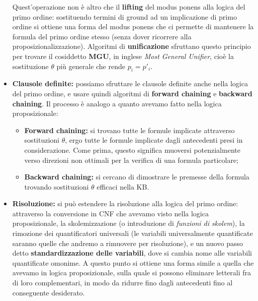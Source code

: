 \documentclass[a4paper,11pt]{article}
\begin{document}
\begin{itemize}
Quest'operazione non è altro che il \textbf{lifting} del modus ponens alla logica del primo ordine: sostituendo termini di ground ad un implicazione di primo ordine si ottiene una forma del modus ponens che ci permette di mantenere la formula del primo ordine stesso (senza dover ricorrere alla proposizionalizzazione).
Algoritmi di \textbf{unificazione} sfruttano questo principio per trovare il cosiddetto \textbf{MGU}, in inglese \textit{Most General Unifier}, cioè la sostituzione $\theta$ più generale che rende $p_i = p'_i$. 
	\item \textbf{Clausole definite:}
		possiamo sfruttare le clausole definite anche nella logica del primo ordine, e usare quindi algoritmi di \textbf{forward chaining} e \textbf{backward chaining}.
		Il processo è analogo a quanto avevamo fatto nella logica proposizionale:
		\begin{itemize}
			\item \textbf{Forward chaining:} si trovano tutte le formule implicate attraverso sostituzioni $\theta$, ergo tutte le formule implicate dagli antecedenti presi in considerazione. Come prima, questo significa muoversi potenzialmente verso direzioni non ottimali per la verifica di una formula particolare;
			\item \textbf{Backward chaining:} si cercano di dimostrare le premesse della formula trovando sostituzioni $\theta$ efficaci nella KB.
		\end{itemize}
	\item \textbf{Risoluzione:} si può estendere la risoluzione alla logica del primo ordine: attraverso la conversione in CNF che avevamo visto nella logica proposizionale, la skolemizzazione (o introduzione di \textit{funzioni di skolem}), la rimozione dei quantificatori universali (le variabili universalmente quantificate saranno quelle che andremo a rimuovere per risoluzione), e un nuovo passo detto \textbf{standardizzazione delle variabili}, dove si cambia nome alle variabili quantificate omonime.
		A questo punto si ottiene una forma simile a quella che avevamo in logica proposizionale, sulla quale si possono eliminare letterali fra di loro complementari, in modo da ridurre fino dagli antecedenti fino al conseguente desiderato.
\end{itemize}

\TODO %
\end{document}
